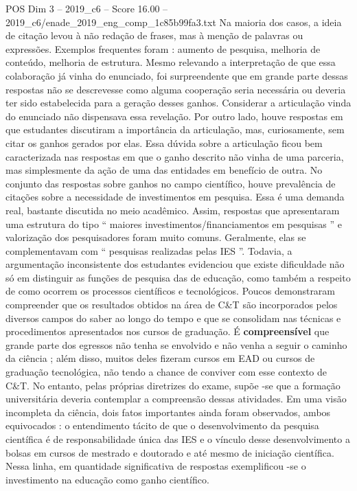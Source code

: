 \begin{textsample}{POS Dim 3 – 2019\_c6 – Score 16.00 – 2019\_c6/enade\_2019\_eng\_comp\_1c85b99fa3.txt}
Na maioria dos casos, a ideia de citação levou à não redação de frases, mas à menção de palavras ou expressões.
Exemplos frequentes foram : aumento de pesquisa, melhoria de conteúdo, melhoria de estrutura.
Mesmo relevando a interpretação de que essa colaboração já vinha do enunciado, foi surpreendente que em grande parte dessas respostas não se descrevesse como alguma cooperação seria necessária ou deveria ter sido estabelecida para a geração desses ganhos.
Considerar a articulação vinda do enunciado não dispensava essa revelação.
Por outro lado, houve respostas em que estudantes discutiram a importância da articulação, mas, curiosamente, sem citar os ganhos gerados por elas.
Essa dúvida sobre a articulação ficou bem caracterizada nas respostas em que o ganho descrito não vinha de uma parceria, mas simplesmente da ação de uma das entidades em benefício de outra.
No conjunto das respostas sobre ganhos no campo científico, houve prevalência de citações sobre a necessidade de investimentos em pesquisa.
Essa é uma demanda real, bastante discutida no meio acadêmico.
Assim, respostas que apresentaram uma estrutura do tipo “ maiores investimentos/financiamentos em pesquisas ” e valorização dos pesquisadores foram muito comuns.
Geralmente, elas se complementavam com “ pesquisas realizadas pelas IES ”.
Todavia, a argumentação inconsistente dos estudantes evidenciou que existe dificuldade não só em distinguir as funções de pesquisa das de educação, como também a respeito de como ocorrem os processos científicos e tecnológicos.
Poucos demonstraram compreender que os resultados obtidos na área de C\&T são incorporados pelos diversos campos do saber ao longo do tempo e que se consolidam nas técnicas e procedimentos apresentados nos cursos de graduação.
É \textbf{compreensível} que grande parte dos egressos não tenha se envolvido e não venha a seguir o caminho da ciência ; além disso, muitos deles fizeram cursos em EAD ou cursos de graduação tecnológica, não tendo a chance de conviver com esse contexto de C\&T.
No entanto, pelas próprias diretrizes do exame, supõe -se que a formação universitária deveria contemplar a compreensão dessas atividades.
Em uma visão incompleta da ciência, dois fatos importantes ainda foram observados, ambos equivocados : o entendimento tácito de que o desenvolvimento da pesquisa científica é de responsabilidade única das IES e o vínculo desse desenvolvimento a bolsas em cursos de mestrado e doutorado e até mesmo de iniciação científica.
Nessa linha, em quantidade significativa de respostas exemplificou -se o investimento na educação como ganho científico.

\end{textsample}
